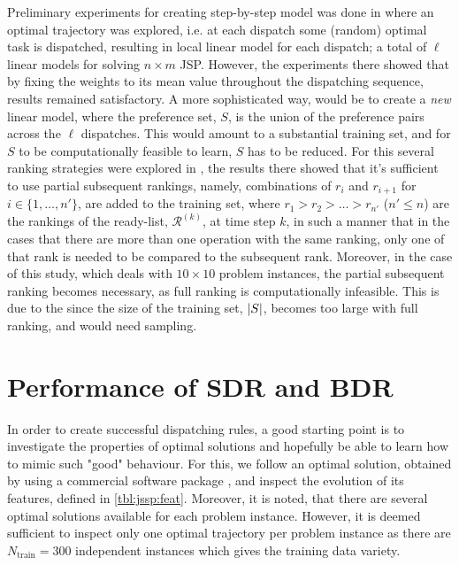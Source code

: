 \documentclass[smallextended]{svjour3}
\begin{document}
Preliminary experiments for creating step-by-step model was done in \cite{InRu11a} where an optimal trajectory was explored, i.e. at each dispatch some (random) optimal task is dispatched, resulting in local linear model for each dispatch; a total of $\ell$ linear models for solving $n\times m$ JSP. However, the experiments there showed that by fixing the weights to its mean value throughout the dispatching sequence, results remained satisfactory.  
A more sophisticated way, would be to create a \emph{new} linear model, where the preference set, $S$, is the union of the preference pairs across the $\ell$ dispatches. This would amount to a substantial training set, and for $S$ to be computationally feasible to learn, $S$ has to be reduced. For this several ranking strategies were explored in \cite{InRu14b}, the results there showed that it's sufficient to use partial subsequent rankings, namely, combinations of $r_i$ and $r_{i+1}$ for $i\in\{1,\ldots,n'\}$, are added to the training set, where $r_1>r_2>\ldots>r_{n'}$ ($n'\leq n$) are the rankings of the ready-list, $\mathcal{R}^{(k)}$, at time step $k$, in such a manner that in the cases that there are more than one operation with the same ranking, only one of that rank is needed to be compared to the subsequent rank. Moreover, in the case of this study, which deals with $10\times 10$ problem instances, the partial subsequent ranking becomes necessary, as full ranking is computationally infeasible. This is due to the since the size of the training set, $\lvert S\rvert$, becomes too large with full ranking, and would need sampling.

\section{Performance of SDR and BDR}\label{sec:opt}
In order to create successful dispatching rules, a good starting point is to investigate the properties of optimal solutions and hopefully be able to learn how to mimic such "good" behaviour. For this, we follow an optimal solution, obtained by using a commercial software package \cite{gurobi}, and inspect the evolution of its features, defined in \cref{tbl:jssp:feat}. Moreover, it is noted, that there are several optimal solutions available for each problem instance. However, it is deemed sufficient to inspect only one optimal trajectory per problem instance as there are $N_{\text{train}}=300$ independent instances which gives the training data variety. 
\end{document}
